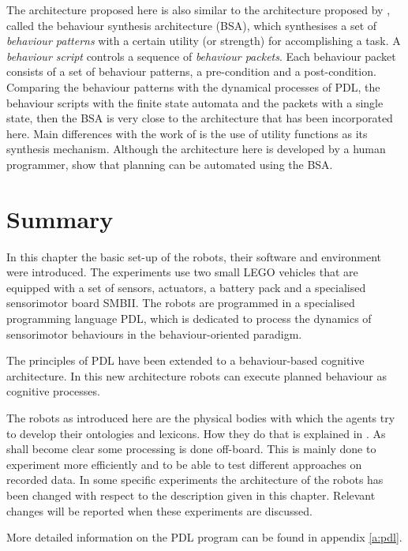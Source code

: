 
The architecture proposed here is also similar to the architecture proposed by \citep{barnes:1996,barnesetal:1997}, called the behaviour synthesis architecture (BSA), which synthesises a set of {\em behaviour patterns} with a certain utility (or strength) for accomplishing a task. A {\em behaviour script} controls a sequence of {\em behaviour packets}. Each behaviour packet consists of a set of behaviour patterns, a pre-condition and a post-condition. Comparing the behaviour patterns with the dynamical processes of PDL, the behaviour scripts with the finite state automata and the packets with a single state, then the BSA is very close to the architecture that has been incorporated here. Main differences with the work of \citep{barnes:1996} is the use of utility functions as its synthesis mechanism. Although the architecture here is developed by a human programmer, \citep{barnesetal:1997} show that planning can be automated using the BSA.


\section{Summary}

In this chapter the basic set-up of the robots, their software and environment were introduced. The experiments use two small LEGO vehicles that are equipped with a set of sensors, actuators, a battery pack and a specialised sensorimotor board SMBII. The robots are programmed in a specialised programming language PDL, which is dedicated to process the dynamics of sensorimotor behaviours in the behaviour-oriented paradigm.

The principles of PDL have been extended to a behaviour-based cognitive architecture. In this new architecture robots can execute planned behaviour as cognitive processes.

The robots as introduced here are the physical bodies with which the agents try to develop their ontologies and lexicons. How they do that is explained in . As shall become clear some processing is done off-board. This is mainly done to experiment more efficiently and to be able to test different approaches on recorded data.  In some specific experiments the architecture of the robots has been changed with respect to the description given in this chapter. Relevant changes will be reported when these experiments are discussed.

 More detailed information on the PDL program can be found in appendix \ref{a:pdl}.







